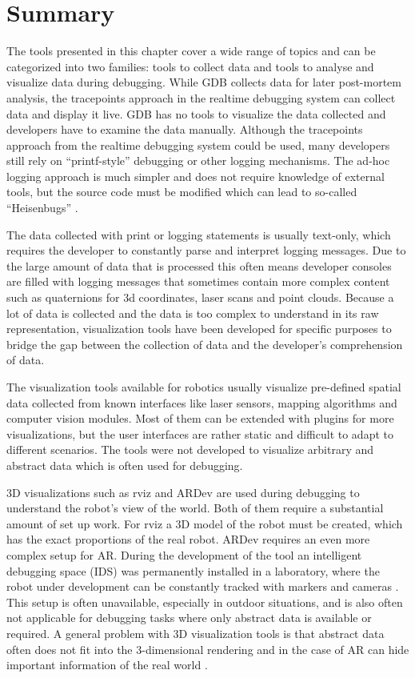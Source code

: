 \section{Summary}

The tools presented in this chapter cover a wide range of topics and can be categorized into two families: tools to collect data and tools to analyse and visualize data during debugging. While GDB collects data for later post-mortem analysis, the tracepoints approach in the realtime debugging system can collect data and display it live. GDB has no tools to visualize the data collected and developers have to examine the data manually. Although the tracepoints approach from the realtime debugging system \cite{Gumbley2009} could be used, many developers still rely on ``printf-style'' debugging or other logging mechanisms. The ad-hoc logging approach is much simpler and does not require knowledge of external tools, but the source code must be modified which can lead to so-called ``Heisenbugs'' \cite{Grottke2005}.

The data collected with print or logging statements is usually text-only, which requires the developer to constantly parse and interpret logging messages. Due to the large amount of data that is processed this often means developer consoles are filled with logging messages that sometimes contain more complex content such as quaternions for 3d coordinates, laser scans and point clouds. Because a lot of data is collected and the data is too complex to understand in its raw representation, visualization tools have been developed for specific purposes to bridge the gap between the collection of data and the developer's comprehension of data.

The visualization tools available for robotics usually visualize pre-defined spatial data collected from known interfaces like laser sensors, mapping algorithms and computer vision modules. Most of them can be extended with plugins for more visualizations, but the user interfaces are rather static and difficult to adapt to different scenarios. The tools were not developed to visualize arbitrary and abstract data which is often used for debugging.

3D visualizations such as rviz and ARDev are used during debugging to understand the robot's view of the world. Both of them require a substantial amount of set up work. For rviz a 3D model of the robot must be created, which has the exact proportions of the real robot. ARDev requires an even more complex setup for AR. During the development of the tool an intelligent debugging space (IDS) was permanently installed in a laboratory, where the robot under development can be constantly tracked with markers and cameras \cite{Collett2010}. This setup is often unavailable, especially in outdoor situations, and is also often not applicable for debugging tasks where only abstract data is available or required. A general problem with 3D visualization tools is that abstract data often does not fit into the 3-dimensional rendering and in the case of AR can hide important information of the real world \cite{Collett2010}.
